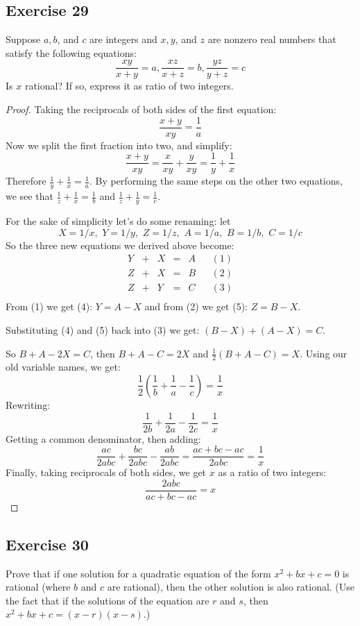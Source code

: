 \documentclass[14pt]{extarticle}
\newcommand{\dps}{\displaystyle}
\begin{document}
\subsection{Exercise 29}
Suppose $a, b$, and $c$ are integers and $x, y$, and $z$ are nonzero real numbers that satisfy the following equations:
\[
    \frac{xy}{x+y} = a, \frac{xz}{x+z} = b, \frac{yz}{y+z} = c
\]
Is $x$ rational? If so, express it as ratio of two integers.

\begin{proof}
    Taking the reciprocals of both sides of the first equation:
    \[
        \frac{x+y}{xy} = \frac{1}{a}
    \]
    Now we split the first fraction into two, and simplify:
    \[
        \frac{x+y}{xy} = \frac{x}{xy} + \frac{y}{xy} = \frac{1}{y} + \frac{1}{x}
    \]
    Therefore $\dps\frac{1}{y} + \frac{1}{x} = \frac{1}{a}$. By performing the same steps on the other two equations, we see that $\dps\frac{1}{z} + \frac{1}{x} = \frac{1}{b}$ and $\dps\frac{1}{z} + \frac{1}{y} = \frac{1}{c}$.

    For the sake of simplicity let's do some renaming: let
    \[
        X = 1/x, \,\, Y = 1/y, \,\, Z = 1/z, \,\, A = 1/a, \,\, B = 1/b, \,\, C = 1/c
    \]
    So the three new equations we derived above become:
    \[
        \begin{array}{ccccccc}
            Y & + & X & = & A &  & (1) \\
            Z & + & X & = & B &  & (2) \\
            Z & + & Y & = & C &  & (3) \\
        \end{array}
    \]
    From (1) we get (4): $Y = A - X$ and from (2) we get (5): $Z = B - X$.

    Substituting (4) and (5) back into (3) we get: $(B-X) + (A-X) = C$.

    So $B+A-2X = C$, then $B+A-C = 2X$ and $\frac{1}{2}(B+A-C) = X$. Using our old variable names, we get:
    \[
        \frac{1}{2}\left(\frac{1}{b}+\frac{1}{a}-\frac{1}{c}\right) = \frac{1}{x}
    \]
    Rewriting:
    \[
        \frac{1}{2b}+\frac{1}{2a}-\frac{1}{2c} = \frac{1}{x}
    \]
    Getting a common denominator, then adding:
    \[
        \frac{ac}{2abc}+\frac{bc}{2abc}-\frac{ab}{2abc} = \frac{ac + bc - ac}{2abc} = \frac{1}{x}
    \]
    Finally, taking reciprocals of both sides, we get $x$ as a ratio of two integers:
    \[
        \frac{2abc}{ac + bc - ac} = x
    \]
\end{proof}

\subsection{Exercise 30}
Prove that if one solution for a quadratic equation of the form $x^2 + bx + c = 0$ is rational (where $b$ and $c$ are rational), then the other solution is also rational. (Use the fact that if the solutions of the equation are $r$ and $s$, then $x^2 + bx + c = (x - r)(x - s)$.)
\end{document}
